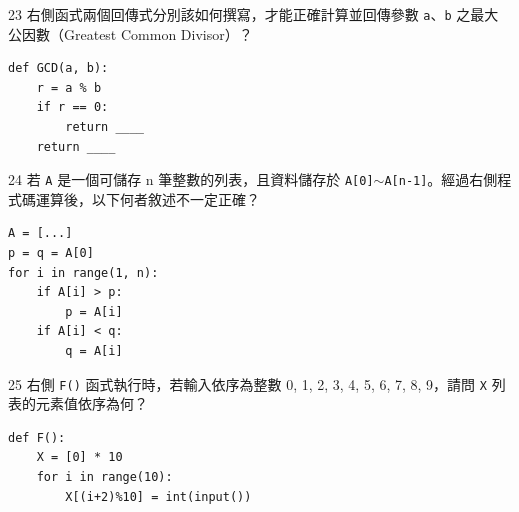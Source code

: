 \medskip

\begin{qbox}{23}
右側函式兩個回傳式分別該如何撰寫，才能正確計算並回傳參數 \texttt{a}、\texttt{b} 之最大公因數（Greatest Common Divisor）？

\begin{verbatim}
def GCD(a, b):
    r = a % b
    if r == 0:
        return ____
    return ____
\end{verbatim}

\end{qbox}

\medskip

\begin{qbox}{24}
若 \texttt{A} 是一個可儲存 n 筆整數的列表，且資料儲存於 \texttt{A[0]}$\sim$\texttt{A[n-1]}。經過右側程式碼運算後，以下何者敘述不一定正確？

\begin{verbatim}
A = [...]
p = q = A[0]
for i in range(1, n):
    if A[i] > p:
        p = A[i]
    if A[i] < q:
        q = A[i]
\end{verbatim}

\end{qbox}

\medskip

\begin{qbox}{25}
右側 \texttt{F()} 函式執行時，若輸入依序為整數 0, 1, 2, 3, 4, 5, 6, 7, 8, 9，請問 \texttt{X} 列表的元素值依序為何？

\begin{verbatim}
def F():
    X = [0] * 10
    for i in range(10):
        X[(i+2)%10] = int(input())
\end{verbatim}

\end{qbox}

\medskip

